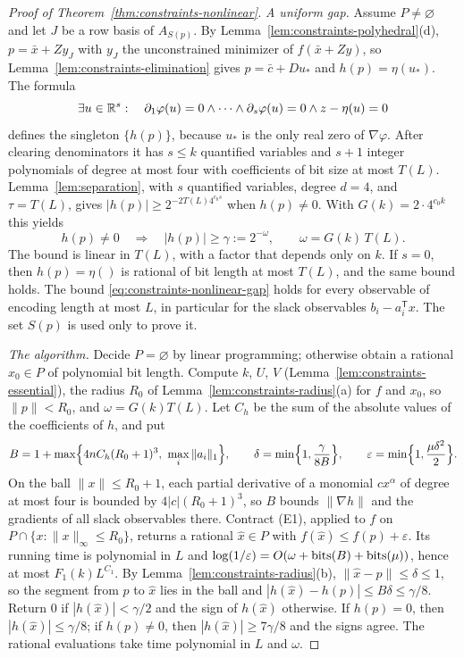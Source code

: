 \begin{proof}[Proof of Theorem~\ref{thm:constraints-nonlinear}]
\emph{A uniform gap.} Assume $P\ne\varnothing$ and let $J$ be a row basis of
$A_{S(p)}$. By Lemma~\ref{lem:constraints-polyhedral}(d), $p=\bar x+Zy_J$
with $y_J$ the unconstrained minimizer of $f(\bar x+Zy)$, so
Lemma~\ref{lem:constraints-elimination} gives $p=\bar c+Du_*$ and
$h(p)=\eta(u_*)$. The formula
\[
 \exists u\in\mathbb R^s:\quad \partial_1\varphi(u)=0\wedge\cdots\wedge
 \partial_s\varphi(u)=0\wedge z-\eta(u)=0
\]
defines the singleton $\{h(p)\}$, because $u_*$ is the only real zero of
$\nabla\varphi$. After clearing denominators it has $s\le k$ quantified
variables and $s+1$ integer polynomials of degree at most four with
coefficients of bit size at most $T(L)$. Lemma~\ref{lem:separation}, with
$s$ quantified variables, degree $d=4$, and $\tau=T(L)$, gives
$|h(p)|\ge2^{-2T(L)4^{c_0s}}$ when $h(p)\ne0$. With $G(k)=2\cdot4^{c_0k}$
this yields
\begin{equation}\label{eq:constraints-nonlinear-gap}
 h(p)\ne0\quad\Longrightarrow\quad|h(p)|\ge\gamma:=2^{-\omega},\qquad
 \omega=G(k)\,T(L).
\end{equation}
The bound is linear in $T(L)$, with a factor that depends only on $k$. If
$s=0$, then $h(p)=\eta()$ is rational of bit length at most $T(L)$, and the
same bound holds. The bound \eqref{eq:constraints-nonlinear-gap} holds for every
observable of encoding length at most $L$, in particular for the slack
observables $b_i-a_i^{\mathsf T}x$. The set $S(p)$ is used only to prove it.

\emph{The algorithm.} Decide $P=\varnothing$ by linear programming; otherwise
obtain a rational $x_0\in P$ of polynomial bit length. Compute $k$, $U$, $V$
(Lemma~\ref{lem:constraints-essential}), the radius $R_0$ of
Lemma~\ref{lem:constraints-radius}(a) for $f$ and $x_0$, so $\|p\|<R_0$, and
$\omega=G(k)T(L)$. Let $C_h$ be the sum of the absolute values of the
coefficients of $h$, and put
\[
 B=1+\max\Bigl\{4nC_h(R_0+1)^3,\ \max_i\|a_i\|_1\Bigr\},\qquad
 \delta=\min\Bigl\{1,\frac{\gamma}{8B}\Bigr\},\qquad
 \varepsilon=\min\Bigl\{1,\frac{\mu\delta^2}2\Bigr\}.
\]
On the ball $\|x\|\le R_0+1$, each partial derivative of a monomial
$cx^\alpha$ of degree at most four is bounded by $4|c|(R_0+1)^3$, so $B$
bounds $\|\nabla h\|$ and the gradients of all slack observables there.
Contract (E1), applied to $f$ on $P\cap\{x:\|x\|_\infty\le R_0\}$, returns a
rational $\hat x\in P$ with $f(\hat x)\le f(p)+\varepsilon$. Its running time
is polynomial in $L$ and $\log(1/\varepsilon)=O(\omega+\operatorname{bits}(B)+\operatorname{bits}(\mu))$,
hence at most $F_1(k)L^{C_1}$. By Lemma~\ref{lem:constraints-radius}(b),
$\|\hat x-p\|\le\delta\le1$, so the segment from $p$ to $\hat x$ lies in the
ball and $|h(\hat x)-h(p)|\le B\delta\le\gamma/8$. Return $0$ if
$|h(\hat x)|<\gamma/2$ and the sign of $h(\hat x)$ otherwise. If $h(p)=0$, then
$|h(\hat x)|\le\gamma/8$; if $h(p)\ne0$, then $|h(\hat x)|\ge7\gamma/8$ and the
signs agree. The rational evaluations take time polynomial in $L$ and $\omega$.


\end{proof}
